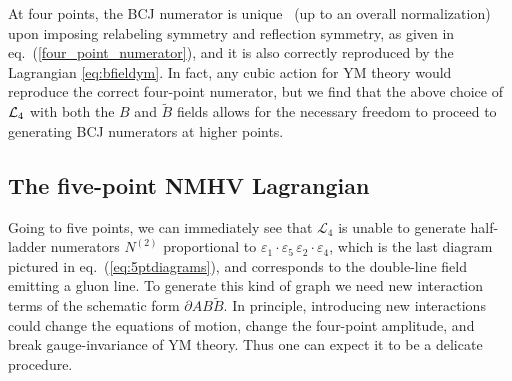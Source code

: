 \documentclass[11pt,a4paper]{article}
\def\eqn#1{eq.~(\ref{#1})}
\begin{document}
At four points, the BCJ numerator is unique~\cite{Chen:2021chy} (up to an overall normalization) upon imposing relabeling symmetry and reflection symmetry, as given in \eqn{four_point_numerator}, and it is also correctly reproduced by the Lagrangian \eqref{eq:bfieldym}. In fact, any cubic action for YM theory would reproduce the correct four-point numerator, but we find that the above choice of ${\cal L}_4$ with both the $B$ and $\tilde{B}$ fields allows for the necessary freedom to proceed to generating BCJ numerators at higher points. 

\subsection{The five-point NMHV Lagrangian}
Going to five points, we can immediately see that $\mathcal{L}_4$ is unable to generate half-ladder numerators $N^{(2)}$  proportional to $\varepsilon_1 {\cdot} \varepsilon_5 \, \varepsilon_2 {\cdot} \varepsilon_4$, which is the last diagram pictured in \eqn{eq:5ptdiagrams}, and corresponds to the double-line field emitting a gluon line. To generate this kind of graph we need new interaction terms of the schematic form $\partial A B \tilde{B}$. In principle, introducing new interactions could change the equations of motion, change the four-point amplitude, and break gauge-invariance of YM theory. Thus one can expect it to be a delicate procedure.  
\end{document}
